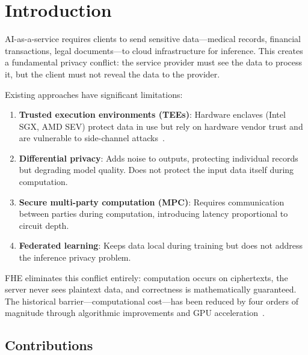 \section{Introduction}

\label{sec:intro}

AI-as-a-service requires clients to send sensitive data---medical records,
financial transactions, legal documents---to cloud infrastructure for inference.
This creates a fundamental privacy conflict: the service provider must see the
data to process it, but the client must not reveal the data to the provider.

Existing approaches have significant limitations:
\begin{enumerate}[leftmargin=1.4em]
    \item \textbf{Trusted execution environments (TEEs)}: Hardware enclaves
    (Intel SGX, AMD SEV) protect data in use but rely on hardware vendor trust
    and are vulnerable to side-channel attacks~\cite{sgxattacks}.
    \item \textbf{Differential privacy}: Adds noise to outputs, protecting
    individual records but degrading model quality. Does not protect the input
    data itself during computation.
    \item \textbf{Secure multi-party computation (MPC)}: Requires communication
    between parties during computation, introducing latency proportional to
    circuit depth.
    \item \textbf{Federated learning}: Keeps data local during training but
    does not address the inference privacy problem.
\end{enumerate}

FHE eliminates this conflict entirely: computation occurs on ciphertexts, the
server never sees plaintext data, and correctness is mathematically guaranteed.
The historical barrier---computational cost---has been reduced by four orders
of magnitude through algorithmic improvements and GPU
acceleration~\cite{fhesurvey2024}.

\subsection{Contributions}

